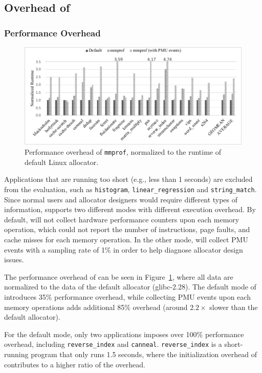 \subsection{Overhead of \MP{}}

\subsubsection{Performance Overhead}
\label{sec:perf}

\begin{figure}[!ht]
\centering
\includegraphics[width=\columnwidth]{figures/mmprofPerformance}
\caption{Performance overhead of \texttt{mmprof}, normalized to the runtime of default Linux allocator.\label{fig:overhead}}
\end{figure}

Applications that are running too short (e.g., less than 1 seconds) are excluded from the evaluation, such as \texttt{histogram}, \texttt{linear\_regression} and \texttt{string\_match}. 
Since normal users and allocator designers would require different types of information, \MP{} supports two different modes with different execution overhead. By default, \MP{} will not collect hardware performance counters upon each memory operation, which could not report the number of instructions, page faults, and cache misses for each memory operation. In the other mode, \MP{} will collect PMU events with a sampling rate of 1\% in order to help diagnose allocator design issues. 

The performance overhead of \MP{} can be seen in Figure~\ref{fig:overhead}, where all data are normalized to the data of the default allocator (glibc-2.28). The default mode of \MP{} introduces 35\% performance overhead, while collecting PMU events upon each memory operations adds additional 85\%  overhead (around $2.2\times$ slower than  the default allocator). 

For the default mode, only two applications imposes over 100\% performance overhead, including \texttt{reverse\_index} and \texttt{canneal}. \texttt{reverse\_index} is a short-running program that only runs 1.5 seconds, where the initialization overhead of \MP{} contributes to a higher ratio of the overhead.  

